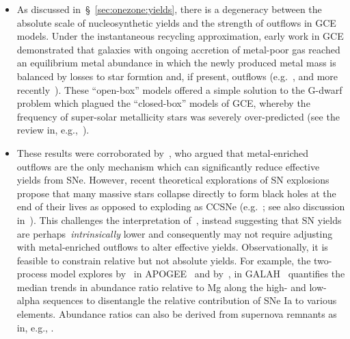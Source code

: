 \documentclass[ms.tex]{subfiles}
\begin{document}
\begin{itemize}

	\item As discussed in~\S~\ref{sec:onezone:yields}, there is a
	degeneracy between the absolute scale of nucleosynthetic yields and the
	strength of outflows in GCE models.
	Under the instantaneous recycling approximation, early work in GCE
	demonstrated that galaxies with ongoing accretion of metal-poor gas
	reached an equilibrium metal abundance in which the newly produced metal
	mass is balanced by losses to star formtion and, if present, outflows
	(e.g.~\citealp{Larson1972}, and more recently~\citealp{Weinberg2017}).
	These ``open-box'' models offered a simple solution to the G-dwarf problem
	which plagued the ``closed-box'' models of GCE, whereby the frequency of
	super-solar metallicity stars was severely over-predicted (see the review
	in, e.g.,~\citealp{Tinsley1980}).

	\item These results were corroborated by~\citet{Dalcanton2007}, who argued
	that metal-enriched outflows are the only mechanism which can
	significantly reduce effective yields from SNe.
	However, recent theoretical explorations of SN explosions propose that
	many massive stars collapse directly to form black holes at the end of
	their lives as opposed to exploding as CCSNe (e.g.~\citealp{Ertl2016,
	Sukhbold2016}; see also discussion in~\citealp{Griffith2021}).
	This challenges the interpretation of~\citet{Dalcanton2007}, instead
	suggesting that SN yields are perhaps~\textit{intrinsically} lower and
	consequently may not require adjusting with metal-enriched outflows to
	alter effective yields.
	Observationally, it is feasible to constrain relative but not absolute
	yields.
	For example, the two-process model explores by~\citet{Weinberg2019,
	Weinberg2021} in APOGEE~\citep{Majewski2017} and by~\citet*{Griffith2019},
	\citet{Griffith2022} in GALAH~\citep{DeSilva2015, Martell2017} quantifies
	the median trends in abundance ratio relative to Mg along the high- and
	low-alpha sequences to disentangle the relative contribution of SNe Ia
	to various elements.
	Abundance ratios can also be derived from supernova remnants as in, e.g.,
	\citet*{Holland-Ashford2020}.


\end{itemize}
\end{document}
